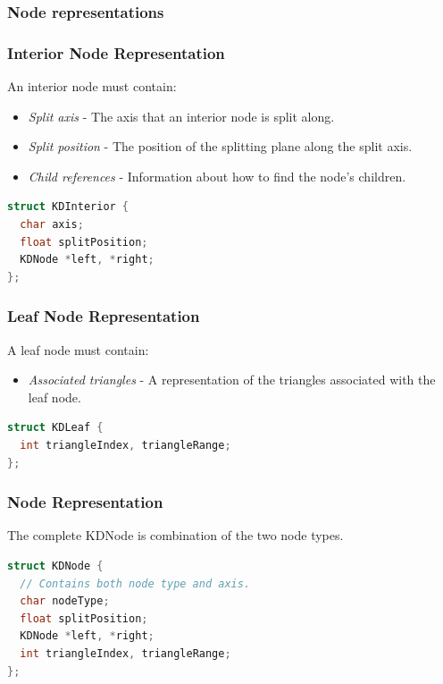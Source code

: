 \documentclass{beamer}
\begin{document}
\subsubsection{Node representations}
\begin{frame}[fragile]
  \frametitle{Interior Node Representation}
  An interior node must contain:
  \begin{itemize}
  \item \textit{Split axis} - The axis that an interior node is split
    along.
  \item \textit{Split position} - The position of the splitting plane
    along the split axis.
  \item \textit{Child references} - Information about how to find the
    node's children.
  \end{itemize}

  \begin{lstlisting}[language=C++]
struct KDInterior {
  char axis;
  float splitPosition;
  KDNode *left, *right;
};
  \end{lstlisting}
\end{frame}

\begin{frame}[fragile]
  \frametitle{Leaf Node Representation}
  A leaf node must contain:
  \begin{itemize}
    \item \textit{Associated triangles} - A representation of the triangles
      associated with the leaf node.
  \end{itemize}
  \begin{lstlisting}[language=C++]
struct KDLeaf {
  int triangleIndex, triangleRange;
};
  \end{lstlisting}
\end{frame}

\begin{frame}[fragile]
  \frametitle{Node Representation}
  The complete KDNode is combination of the two node types.
  \begin{lstlisting}[language=C++]
struct KDNode {
  // Contains both node type and axis.
  char nodeType;
  float splitPosition;
  KDNode *left, *right;
  int triangleIndex, triangleRange;
};
  \end{lstlisting}
\end{frame}
\end{document}
